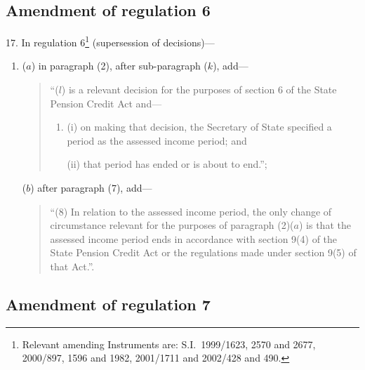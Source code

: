 \documentclass[12pt,a4paper]{article}
\begin{document}
\subsection[17. Amendment of regulation 6]{Amendment of regulation 6}

17.  In regulation 6\footnote{Relevant amending Instruments are: S.I.\ 1999/1623, 2570 and 2677, 2000/897, 1596 and 1982, 2001/1711 and 2002/428 and 490.} (supersession of decisions)—
\begin{enumerate}\item[]
($a$) in paragraph (2), after sub-paragraph ($k$), add—
\begin{quotation}
“($l$) is a relevant decision for the purposes of section 6 of the State Pension Credit Act and—
\begin{enumerate}\item[]
(i) on making that decision, the Secretary of State specified a period as the assessed income period; and

(ii) that period has ended or is about to end.”;
\end{enumerate}
\end{quotation}

($b$) after paragraph (7), add—
\begin{quotation}
“(8) In relation to the assessed income period, the only change of circumstance relevant for the purposes of paragraph (2)($a$)  is that the assessed income period ends in accordance with section 9(4) of the State Pension Credit Act or the regulations made under section 9(5) of that Act.”.
\end{quotation}
\end{enumerate}

\subsection[18. Amendment of regulation 7]{Amendment of regulation 7}
\end{document}
